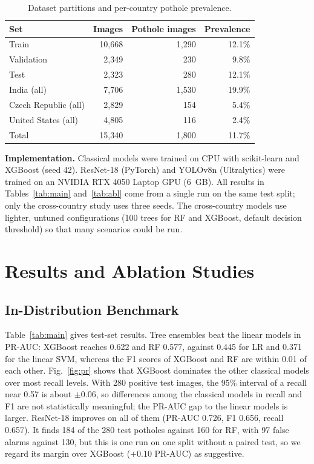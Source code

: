 \documentclass[conference]{IEEEtran}
\begin{document}
\begin{table}[t]
\centering
\caption{Dataset partitions and per-country pothole prevalence.}
\label{tab:data}
\begin{tabular}{lrrr}
\toprule
Set & Images & Pothole images & Prevalence \\
\midrule
Train & 10,668 & 1,290 & 12.1\% \\
Validation & 2,349 & 230 & 9.8\% \\
Test & 2,323 & 280 & 12.1\% \\
\midrule
India (all) & 7,706 & 1,530 & 19.9\% \\
Czech Republic (all) & 2,829 & 154 & 5.4\% \\
United States (all) & 4,805 & 116 & 2.4\% \\
\midrule
Total & 15,340 & 1,800 & 11.7\% \\
\bottomrule
\end{tabular}
\end{table}

\textbf{Implementation.} Classical models were trained on CPU with scikit-learn and XGBoost (seed 42). ResNet-18 (PyTorch) and YOLOv8n (Ultralytics) were trained on an NVIDIA RTX 4050 Laptop GPU (6~GB). All results in Tables~\ref{tab:main} and~\ref{tab:abl} come from a single run on the same test split; only the cross-country study uses three seeds. The cross-country models use lighter, untuned configurations (100 trees for RF and XGBoost, default decision threshold) so that many scenarios could be run.

\section{Results and Ablation Studies}

\subsection{In-Distribution Benchmark}
Table~\ref{tab:main} gives test-set results. Tree ensembles beat the linear models in PR-AUC: XGBoost reaches 0.622 and RF 0.577, against 0.445 for LR and 0.371 for the linear SVM, whereas the F1 scores of XGBoost and RF are within 0.01 of each other. Fig.~\ref{fig:pr} shows that XGBoost dominates the other classical models over most recall levels. With 280 positive test images, the 95\% interval of a recall near 0.57 is about $\pm0.06$, so differences among the classical models in recall and F1 are not statistically meaningful; the PR-AUC gap to the linear models is larger. ResNet-18 improves on all of them (PR-AUC 0.726, F1 0.656, recall 0.657). It finds 184 of the 280 test potholes against 160 for RF, with 97 false alarms against 130, but this is one run on one split without a paired test, so we regard its margin over XGBoost ($+0.10$ PR-AUC) as suggestive.
\end{document}
